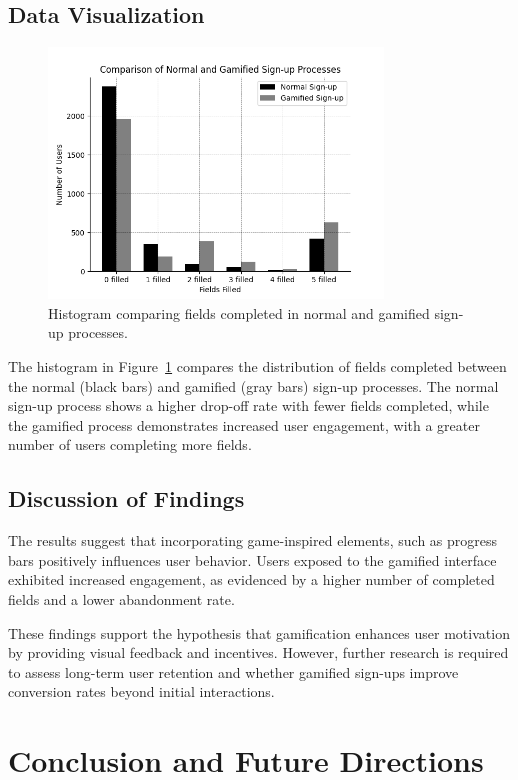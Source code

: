 \documentclass[conference]{IEEEtran}
\begin{document}
\subsection{Data Visualization}
\begin{figure}[!ht]
\centering
\includegraphics[width=3.5in]{media/sign_up_comparison.png}
\caption{Histogram comparing fields completed in normal and gamified sign-up processes.}
\label{fig:sign_up_comparison}
\end{figure}
The histogram in Figure~\ref{fig:sign_up_comparison} compares the distribution of fields completed between the normal (black bars) and gamified (gray bars) sign-up processes. The normal sign-up process shows a higher drop-off rate with fewer fields completed, while the gamified process demonstrates increased user engagement, with a greater number of users completing more fields.

\subsection{Discussion of Findings}
The results suggest that incorporating game-inspired elements, such as progress bars positively influences user behavior. Users exposed to the gamified interface exhibited increased engagement, as evidenced by a higher number of completed fields and a lower abandonment rate.

These findings support the hypothesis that gamification enhances user motivation by providing visual feedback and incentives. However, further research is required to assess long-term user retention and whether gamified sign-ups improve conversion rates beyond initial interactions.

\section{Conclusion and Future Directions}
\end{document}
